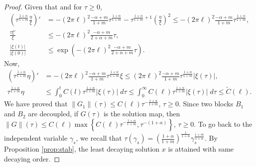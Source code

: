 \documentclass[a4paper,11pt]{article}
\def\l{(2\pi \ell)}
\def\k{(2\pi \ell)}
\theoremstyle{remark}
\begin{document}
\begin{proof}
Given that and for $\tau\ge0$,
\begin{align*}
 \left(\tau^{\frac{1+\alpha}{1+m}}\frac{\eta}{\xi}\right)' &=  -\l^2\frac{-\alpha+m}{1+m}\tau^{\frac{1+\alpha}{1+m}}  -\tau^{\frac{1+\alpha}{1+m}+1}\left(\frac{\eta}{\xi}\right)^2 \le -\l^2\frac{-\alpha+m}{1+m}\tau^{\frac{1+\alpha}{1+m}},\\
 \frac{\tau \xi'}{\xi} &\le -\l^2\frac{-\alpha+m}{2+\alpha+m}\tau,\\
 \frac{|\xi(t)|}{|\xi(0)|} &\le \exp\left(-\l^2\frac{-\alpha+m}{2+\alpha+m}\tau\right).
\end{align*}
Now,
\begin{align*}
 \left(\tau^{\frac{1+\alpha}{1+m}} \eta\right)' &= -\l^2\frac{-\alpha+m}{1+m}\tau^{\frac{1+\alpha}{1+m}}\xi \le \l^2\frac{-\alpha+m}{1+m}\tau^{\frac{1+\alpha}{1+m}} |\xi(\tau)|,\\
 \tau^{\frac{1+\alpha}{1+m}} \eta &\le \int_0^t C(l)\tau^{\frac{1+\alpha}{1+m}} |\xi(\tau)|\; d\tau \le \int_0^\infty C(\ell)\tau^{\frac{1+\alpha}{1+m}} |\xi(\tau)|\; d\tau \le \tilde{C}(\ell).
\end{align*}
We have proved that $\|G_1\|(\tau) \le C(\ell)\tau^{-\frac{1+\alpha}{1+m}}$, $\tau\ge0$. Since two blocks $B_1$ and $B_2$ are decoupled, if $G(\tau)$ is the solution map, then $\|G\|(\tau) \le C(\ell)\max\left\{C(\ell)\tau^{-\frac{1+\alpha}{1+m}},\tau^{-(1+\alpha)}\right\}$, $\tau\ge0$. To go back to the independent variable $\gamma_s$, we recall that $\tau(\gamma_s)=\left( \frac{1+\alpha}{1+m}\right)^{\frac{1}{1+\alpha}} \gamma_s^{\frac{1+m}{1+\alpha}}$. By Proposition \ref{prop:stab}, the least decaying solution $x$ is attained with same decaying order. %


\end{proof}
\end{document}
